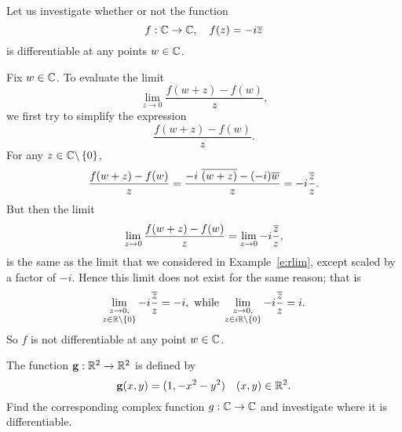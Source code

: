 \begin{example}
\label{e:diff1}
Let us investigate whether or not the function
\[
f:\mathbb{C} \to \mathbb{C}, \quad f(z)=-i\overline{z}
\]
is differentiable at any points $w \in \mathbb{C}$.
\end{example}

\begin{solution}
Fix $w \in \mathbb{C}$. To evaluate the limit
\[
\lim_{z \to 0} \frac{f(w+z)-f(w)}{z},
\]
we first try to simplify the expression
\[
\frac{f(w+z)-f(w)}{z}.
\]
For any $z \in \mathbb{C} \backslash \left\{0\right\}$, 
\[
\frac{f(w+z)-f(w)}{z} = \frac{-i\ \conj{(w+z)}-(-i)\conj{w}}{z} = -i \frac{\conj{z}}{z}.
\]
But then the limit
\[
\lim_{z \to 0} \frac{f(w+z)-f(w)}{z} = \lim_{z \to 0} -i \frac{\overline{z}}{z},
\]
is the same as the limit that we considered in Example~\ref{e:rlim}, except scaled by a factor of $-i$.  Hence this limit does not exist for the same reason; that is
\[
\lim_{\substack{z \to 0, \\ z \in \mathbb{R} \backslash \left\{0\right\}}} -i \frac{\overline{z}}{z} = -i, \text{ while } \lim_{\substack{z \to 0, \\ z \in i\mathbb{R} \backslash \left\{0\right\}}} -i \frac{\overline{z}}{z} = i.
\]
So $f$ is not differentiable at any point $w \in \mathbb{C}$.
\end{solution}



\begin{example}
\label{e:diff2}
The function $\mathbf{g}: \mathbb{R}^2 \to \mathbb{R}^2$ is defined by
\[
\mathbf{g}(x,y)=(1,-x^2-y^2)\quad (x,y) \in \mathbb{R}^2.
\]
Find the corresponding complex function $g:\mathbb{C} \to \mathbb{C}$ and investigate where it is differentiable.
\end{example}

